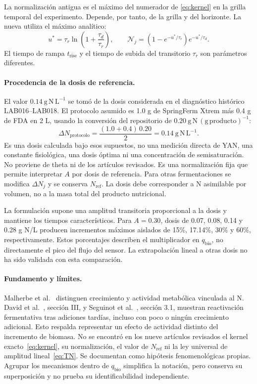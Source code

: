 \documentclass[11pt,a4paper]{article}
\newcommand{\qbio}{q_{\mathrm{bio}}}
\begin{document}
La normalización antigua es el máximo del numerador de
\eqref{eq:kernel} en la grilla temporal del experimento. Depende, por tanto,
de la grilla y del horizonte. La nueva utiliza el máximo analítico:
\begin{equation}
u^*=\tau_r\ln\left(1+\frac{\tau_d}{\tau_r}\right),
\qquad \mathcal N_j=(1-e^{-u^*/\tau_r})e^{-u^*/\tau_d}.
\label{eq:peak}
\end{equation}
El tiempo de rampa $t_{\mathrm{rise}}$ y el tiempo de subida del transitorio
$\tau_r$ son parámetros diferentes.

\paragraph{Procedencia de la dosis de referencia.}
El valor $0.14\ \mathrm{g\,N\,L^{-1}}$ se tomó de la dosis considerada en el
diagnóstico histórico LAB016--LAB018. El protocolo asumido es 1.0 g de
SpringFerm Xtrem más 0.4 g de FDA en 2 L, usando la conversión del repositorio
de $0.20\ \mathrm{g\,N\,(g\,producto)^{-1}}$:
\begin{equation}
\Delta N_{\mathrm{protocolo}}
=\frac{(1.0+0.4)\,0.20}{2}
=0.14\ \mathrm{g\,N\,L^{-1}}.
\label{eq:doseprotocol}
\end{equation}
Es una dosis calculada bajo esos supuestos, no una medición directa de YAN,
una constante fisiológica, una dosis óptima ni una concentración de
semisaturación. No proviene de theta ni de los artículos revisados. Es una
normalización fija que permite interpretar $A$ por dosis de referencia.
Para otras fermentaciones se modifica $\Delta N_j$ y se conserva
$N_{\mathrm{ref}}$. La dosis debe corresponder a N asimilable por volumen,
no a la masa total del producto nutricional.

La formulación supone una amplitud transitoria proporcional a la dosis y
mantiene los tiempos característicos. Para $A=0.30$, dosis de 0.07, 0.08,
0.14 y 0.28 g N/L producen incrementos máximos aislados de 15\%, 17.14\%,
30\% y 60\%, respectivamente. Estos porcentajes describen el multiplicador
en $\qbio$, no directamente el pico del flujo del sensor. La extrapolación
lineal a otras dosis no ha sido validada con esta comparación.

\paragraph{Fundamento y límites.}
Malherbe et al.~\cite{malherbe2004} distinguen crecimiento y actividad
metabólica vinculada al N. David et al.~\cite{david2012}, sección III,
y Seguinot et al.~\cite{seguinot2018}, sección 3.1, muestran reactivación
fermentativa tras adiciones tardías, incluso con poco o ningún crecimiento
adicional. Esto respalda representar un efecto de actividad distinto del
incremento de biomasa. No se encontró en los nueve artículos revisados el
kernel exacto~\eqref{eq:kernel}, su normalización, el valor de
$N_{\mathrm{ref}}$ ni la ley universal de amplitud lineal~\eqref{eq:TN}.
Se documentan como hipótesis fenomenológicas propias.
Agrupar los mecanismos dentro de $\qbio$ simplifica la notación, pero conserva
su superposición y no prueba su identificabilidad independiente.
\end{document}
